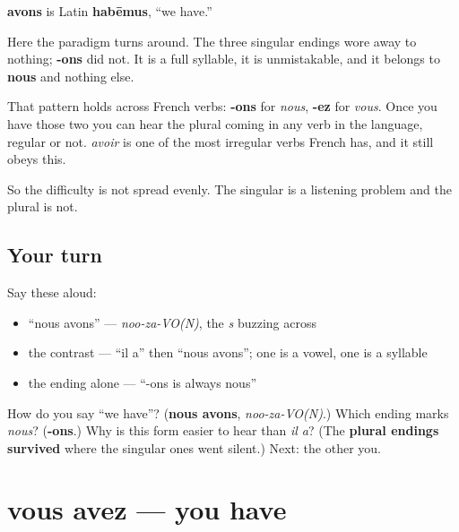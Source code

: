 \begin{cousinweb}
\textbf{avons} is Latin \textbf{habēmus}, \textquotedblleft{}we have.\textquotedblright{}

Here the paradigm turns around. The three singular endings wore away to nothing; \textbf{-ons} did not. It is a full syllable, it is unmistakable, and it belongs to \textbf{nous} and nothing else.

That pattern holds across French verbs: \textbf{-ons} for \emph{nous}, \textbf{-ez} for \emph{vous}. Once you have those two you can hear the plural coming in any verb in the language, regular or not. \emph{avoir} is one of the most irregular verbs French has, and it still obeys this.

So the difficulty is not spread evenly. The singular is a listening problem and the plural is not.
\end{cousinweb}

\subsection*{Your turn}
Say these aloud:

\begin{itemize}
\raggedright
  \item \textquotedblleft{}nous avons\textquotedblright{} — \emph{noo-za-VO(N)}, the \emph{s} buzzing across
  \item the contrast — \textquotedblleft{}il a\textquotedblright{} then \textquotedblleft{}nous avons\textquotedblright{}; one is a vowel, one is a syllable
  \item the ending alone — \textquotedblleft{}-ons is always nous\textquotedblright{}
\end{itemize}

\begin{tcolorbox}[breakable,colback=teal!4,colframe=teal!35!black,title={Before you move on}]
How do you say \textquotedblleft{}we have\textquotedblright{}? (\textbf{nous avons}, \emph{noo-za-VO(N)}.) Which ending marks \emph{nous}? (\textbf{-ons}.) Why is this form easier to hear than \emph{il a}? (The \textbf{plural endings survived} where the singular ones went silent.) Next: the other you.
\end{tcolorbox}
\section[vous avez]{vous avez — you have}

\label{lesson:FR-C14-avez}



